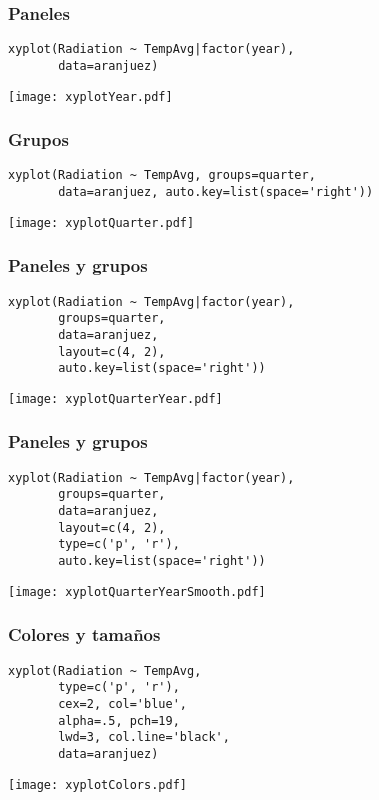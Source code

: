 \documentclass[xcolor={usenames,svgnames,dvipsnames}]{beamer}
\begin{document}
\begin{frame}[fragile]
\frametitle{Paneles}
\label{sec-2-1-6}


\lstset{language=R}
\begin{lstlisting}
xyplot(Radiation ~ TempAvg|factor(year),
       data=aranjuez)
\end{lstlisting}

\texttt{[image: xyplotYear.pdf]}
\end{frame}
\begin{frame}[fragile]
\frametitle{Grupos}
\label{sec-2-1-7}


\lstset{language=R}
\begin{lstlisting}
xyplot(Radiation ~ TempAvg, groups=quarter,
       data=aranjuez, auto.key=list(space='right'))
\end{lstlisting}

\texttt{[image: xyplotQuarter.pdf]}
\end{frame}
\begin{frame}[fragile]
\frametitle{Paneles y grupos}
\label{sec-2-1-8}


\lstset{language=R}
\begin{lstlisting}
xyplot(Radiation ~ TempAvg|factor(year),
       groups=quarter,
       data=aranjuez,
       layout=c(4, 2),
       auto.key=list(space='right'))
\end{lstlisting}

\texttt{[image: xyplotQuarterYear.pdf]}
\end{frame}
\begin{frame}[fragile]
\frametitle{Paneles y grupos}
\label{sec-2-1-9}


\lstset{language=R}
\begin{lstlisting}
xyplot(Radiation ~ TempAvg|factor(year),
       groups=quarter,
       data=aranjuez,
       layout=c(4, 2),
       type=c('p', 'r'),
       auto.key=list(space='right'))
\end{lstlisting}

\texttt{[image: xyplotQuarterYearSmooth.pdf]}
\end{frame}
\begin{frame}[fragile]
\frametitle{Colores y tamaños}
\label{sec-2-1-10}


\lstset{language=R}
\begin{lstlisting}
xyplot(Radiation ~ TempAvg,
       type=c('p', 'r'),
       cex=2, col='blue',
       alpha=.5, pch=19,
       lwd=3, col.line='black',
       data=aranjuez)
\end{lstlisting}

\texttt{[image: xyplotColors.pdf]}
\end{frame}
\end{document}
